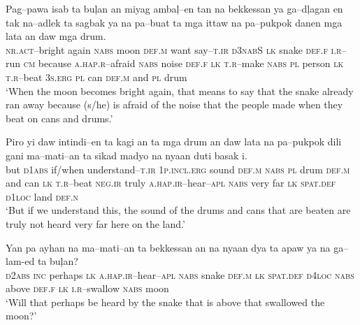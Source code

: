 \ea
\gll Pag--pawa  isab  ta  bu\c{l}an  an  miyag  amba\c{l}--en   tan  na  bekkessan  ya\footnotemark{}  ga--d\c{l}agan  en  tak   na--adlek  ta  sagbak  ya  na  pa--buat  ta  mga   ittaw  na  pa--pukpok  danen  mga  lata  an  daw  mga  drum. \\
\textsc{nr.act}--bright  again  \textsc{nabs}  moon  \textsc{def.m}  want  say--\textsc{t.ir}
\textsc{d3nabS}  \textsc{lk}  snake  \textsc{def.f}  \textsc{i.r}--run  \textsc{cm}  because
\textsc{a.hap.r--}afraid  \textsc{nabs}  noise  \textsc{def.f}  \textsc{lk}  \textsc{t.r}--make  \textsc{nabs}  \textsc{pl}
person  \textsc{lk}  \textsc{t.r}--beat  3\textsc{s.erg}  \textsc{pl}  can  \textsc{def.m}  and  \textsc{pl}  drum \\
\glt ‘When the moon becomes bright again, that means to say that the snake already ran away because (s/he) is afraid of the noise that the people made when they beat on cans and drums.'
\z

\ea
\gll Piro yi daw intindi--en ta kagi an ta mga drum an daw lata na pa--pukpok dili gani ma--mati--an ta sikad madyo na nyaan duti\footnotemark{} basak i. \\
but  \textsc{d1abs}  if/when  understand--\textsc{t.ir}  1\textsc{p.incl.erg}  sound  \textsc{def.m}  \textsc{nabs}
\textsc{pl}  drum  \textsc{def.m}  and  can  \textsc{lk}  \textsc{t.r}--beat  \textsc{neg.ir}  truly  \textsc{a.hap.ir}--hear--\textsc{apl}
\textsc{nabs}  very  far  \textsc{lk}  \textsc{spat.def}  \textsc{d1loc}  land  \textsc{def.n} \\
\glt ‘But if we understand this, the sound of the drums and cans that are beaten are truly not heard very far here on the land.’
\z

\ea
\gll Yan pa ayhan na ma--mati--an ta bekkessan an na nyaan dya ta apaw ya na ga--lam-ed ta bu\c{l}an? \\
\textsc{d2abs}  \textsc{inc}  perhaps  \textsc{lk}  \textsc{a.hap.ir}--hear--\textsc{apl}  \textsc{nabs}  snake  \textsc{def.m}
\textsc{lk}  \textsc{spat.def}  \textsc{d4loc}  \textsc{nabs}  above  \textsc{def.f}  \textsc{lk}  \textsc{i.r}--swallow
\textsc{nabs}  moon \\
\glt ‘Will that perhaps be heard by the snake that is above that swallowed the moon?’
\z

